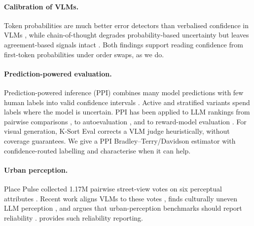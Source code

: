 \paragraph{Calibration of VLMs.}
Token probabilities are much better error detectors than verbalised confidence in VLMs \citep{ferdous2026small}, while chain-of-thought degrades probability-based uncertainty but leaves agreement-based signals intact \citep{welch2026the}. Both findings support reading confidence from first-token probabilities under order swaps, as we do.

\paragraph{Prediction-powered evaluation.}
Prediction-powered inference (PPI) combines many model predictions with few human labels into valid confidence intervals \citep{angelopoulos2023predictionpowered,angelopoulos2023ppi}. Active \citep{zrnic2024active} and stratified \citep{fisch2024stratified} variants spend labels where the model is uncertain.
PPI has been applied to LLM rankings from pairwise comparisons \citep{chatzi2024predictionpowered}, to autoevaluation \citep{boyeau2024autoeval}, and to reward-model evaluation \citep{frick2024how}.
For visual generation, K-Sort Eval \citep{li2026ksort} corrects a VLM judge heuristically, without coverage guarantees. We give a PPI Bradley--Terry/Davidson estimator with confidence-routed labelling and characterise when it can help.

\paragraph{Urban perception.}
Place Pulse \citep{dubey2016deep} collected 1.17M pairwise street-view votes on six perceptual attributes . Recent work aligns VLMs to these votes \citep{zhang2026urbanalign}, finds culturally uneven LLM perception \citep{zhao2026culturally}, and argues that urban-perception benchmarks should report reliability \citep{mushkani2026benchmarks}. \eaglev{} provides such reliability reporting.
